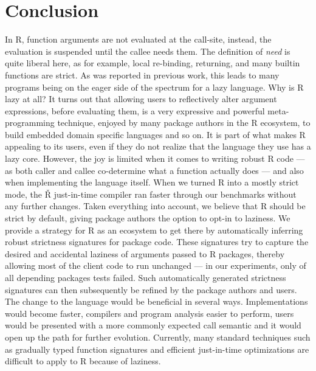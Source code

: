 \documentclass[review,nonacm,screen,acmsmall,anonymous=true]{acmart}
\renewcommand{\Rsh}{{\sf\v R}\xspace}
\begin{document}
\section{Conclusion}\label{sec:conclusion}

In R, function arguments are not evaluated at the call-site, instead, the
evaluation is suspended until the callee needs them. The definition of
\emph{need} is quite liberal here, as for example, local re-binding, returning,
and many builtin functions are strict. As was reported in previous work, this
leads to many programs being on the eager side of the spectrum for a lazy
language. Why is R lazy at all? It turns out that allowing users to reflectively
alter argument expressions, before evaluating them, is a very expressive and
powerful meta-programming technique, enjoyed by many package authors in the R
ecosystem, to build embedded domain specific languages and so on. It is part of
what makes R appealing to its users, even if they do not realize that the
language they use has a lazy core. However, the joy is limited when it comes to
writing robust R code --- as both caller and callee co-determine what a function
actually does --- and also when implementing the language itself. When we turned
R into a mostly strict mode, the \Rsh just-in-time compiler ran
\speedupRshStrict faster through our benchmarks without any further changes.
Taken everything into account, we believe that R should be strict by default,
giving package authors the option to opt-in to laziness. We provide a strategy
for R as an ecosystem to get there by automatically inferring robust strictness
signatures for package code. These signatures try to capture the desired and
accidental laziness of arguments passed to R packages, thereby allowing most of
the client code to run unchanged --- in our experiments, only \robustnesResult of
all depending packages tests failed. Such automatically generated strictness
signatures can then subsequently be refined by the package authors and users.
The change to the language would be beneficial in several ways. Implementations
would become faster, compilers and program analysis easier to perform, users
would be presented with a more commonly expected call semantic and it would open
up the path for further evolution. Currently, many standard techniques such as
gradually typed function signatures and efficient just-in-time optimizations are
difficult to apply to R because of laziness.



\end{document}
